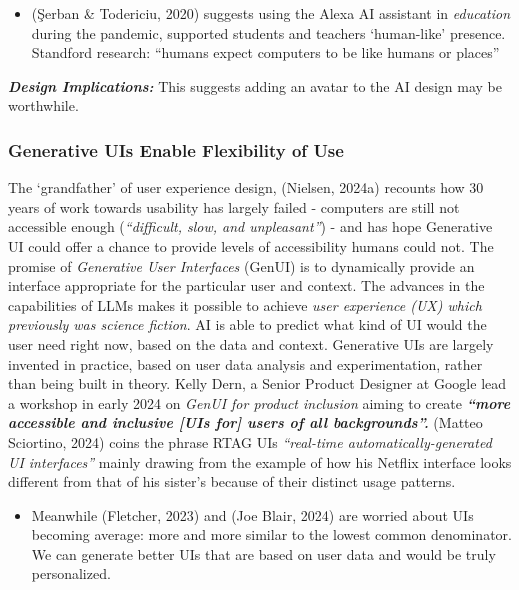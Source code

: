 \documentclass[
  letterpaper,
  DIV=11,
  numbers=noendperiod]{scrartcl}
\providecommand{\tightlist}{%
  \setlength{\itemsep}{0pt}\setlength{\parskip}{0pt}}\usepackage{longtable,booktabs,array}
\begin{document}
\begin{itemize}
\tightlist
\item
  (Şerban \& Todericiu, 2020) suggests using the Alexa AI assistant in
  \emph{education} during the pandemic, supported students and teachers
  `human-like' presence. Standford research: ``humans expect computers
  to be like humans or places''
\end{itemize}

\textbf{\emph{Design Implications:}} This suggests adding an avatar to
the AI design may be worthwhile.

\subsubsection{\texorpdfstring{\textbf{Generative UIs Enable Flexibility
of
Use}}{Generative UIs Enable Flexibility of Use}}\label{generative-uis-enable-flexibility-of-use}

The `grandfather' of user experience design, (Nielsen, 2024a) recounts
how 30 years of work towards usability has largely failed - computers
are still not accessible enough (\emph{``difficult, slow, and
unpleasant''}) - and has hope Generative UI could offer a chance to
provide levels of accessibility humans could not. The promise of
\emph{Generative User Interfaces} (GenUI) is to dynamically provide an
interface appropriate for the particular user and context. The advances
in the capabilities of LLMs makes it possible to achieve \emph{user
experience (UX) which previously was science fiction}. AI is able to
predict what kind of UI would the user need right now, based on the data
and context. Generative UIs are largely invented in practice, based on
user data analysis and experimentation, rather than being built in
theory. Kelly Dern, a Senior Product Designer at Google lead a workshop
in early 2024 on \emph{GenUI for product inclusion} aiming to create
\textbf{\emph{``\textbf{more accessible and inclusive {[}UIs for{]}
users of all backgrounds}''.}} (Matteo Sciortino, 2024) coins the phrase
RTAG UIs \emph{``real-time automatically-generated UI interfaces''}
mainly drawing from the example of how his Netflix interface looks
different from that of his sister's because of their distinct usage
patterns.

\begin{itemize}
\tightlist
\item
  Meanwhile (Fletcher, 2023) and (Joe Blair, 2024) are worried about UIs
  becoming average: more and more similar to the lowest common
  denominator. We can generate better UIs that are based on user data
  and would be truly personalized.
\end{itemize}
\end{document}

